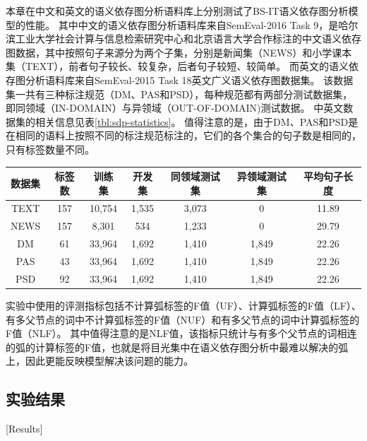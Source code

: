 本章在中文和英文的语义依存图分析语料库上分别测试了BS-IT语义依存图分析模型的性能。
其中中文的语义依存图分析语料库来自SemEval-2016 Task 9\cite{che-etal-2016-semeval}，是哈尔滨工业大学社会计算与信息检索研究中心和北京语言大学合作标注的中文语义依存图数据，其中按照句子来源分为两个子集，分别是新闻集（NEWS）和小学课本集（TEXT），前者句子较长、较复杂，后者句子较短、较简单。
而英文的语义依存图分析语料库来自SemEval-2015 Task 18\cite{oepen-etal-2015-semeval}英文广义语义依存图数据集。
该数据集一共有三种标注规范（DM、PAS和PSD），每种规范都有两部分测试数据集，即同领域（IN-DOMAIN）与异领域（OUT-OF-DOMAIN)测试数据。
中英文数据集的相关信息见表\ref{tbl:sdp-statistics}。
值得注意的是，由于DM、PAS和PSD是在相同的语料上按照不同的标注规范标注的，它们的各个集合的句子数是相同的，只有标签数量不同。

\begin{table}[htbp]
    \vspace{0.5em}\centering\wuhao
    \begin{tabular}{ccccccc}
        \toprule[1.5pt]
        数据集 & 标签数 & 训练集 & 开发集 & 同领域测试集 & 异领域测试集 & 平均句子长度 \\
        \midrule[1pt]
        TEXT & 157 & 10,754 & 1,535 & 3,073 & 0     & 11.89 \\
        NEWS & 157 & 8,301  & 534   & 1,233 & 0     & 29.79 \\
        DM   & 61  & 33,964 & 1,692 & 1,410 & 1,849 & 22.26 \\
        PAS  & 43  & 33,964 & 1,692 & 1,410 & 1,849 & 22.26 \\
        PSD  & 92  & 33,964 & 1,692 & 1,410 & 1,849 & 22.26 \\
        \bottomrule[1.5pt]
    \end{tabular}
\end{table}

实验中使用的评测指标包括不计算弧标签的F值（UF）、计算弧标签的F值（LF）、有多父节点的词中不计算弧标签的F值（NUF）和有多父节点的词中计算弧标签的F值（NLF）。
其中值得注意的是NLF值，该指标只统计与有多个父节点的词相连的弧的计算标签的F值，也就是将目光集中在语义依存图分析中最难以解决的弧上，因此更能反映模型解决该问题的能力。

\subsection{实验结果}[Results]

